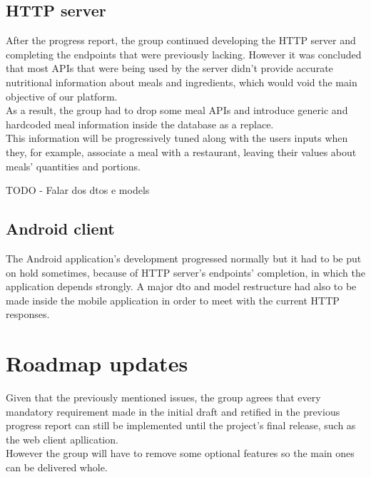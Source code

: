     \subsection{HTTP server}

    After the progress report, the group continued developing the HTTP server and completing the endpoints that were previously lacking. However
    it was concluded that most APIs that were being used by the server didn't provide accurate nutritional information about meals and ingredients,
    which would void the main objective of our platform.\\

    As a result, the group had to drop some meal APIs and introduce generic and hardcoded meal information inside the database as a replace.\\

    This information will be progressively tuned along with the users inputs when they, for example, associate a meal with a restaurant, leaving
    their values about meals' quantities and portions.

    TODO - Falar dos dtos e models

    \subsection{Android client}

    The Android application's development progressed normally but it had to be put on hold sometimes, because of HTTP server's endpoints' completion, in which the application
    depends strongly. A major dto and model restructure had also to be made inside the mobile application in order to meet with the current HTTP responses.\\

    \section{Roadmap updates}

    Given that the previously mentioned issues, the group agrees that every mandatory requirement made in the initial draft
    and retified in the previous progress report can still be implemented until the project's final release, such as the web client apllication.\\
    
    However the group will have to remove some optional features so the main ones can be delivered whole.
